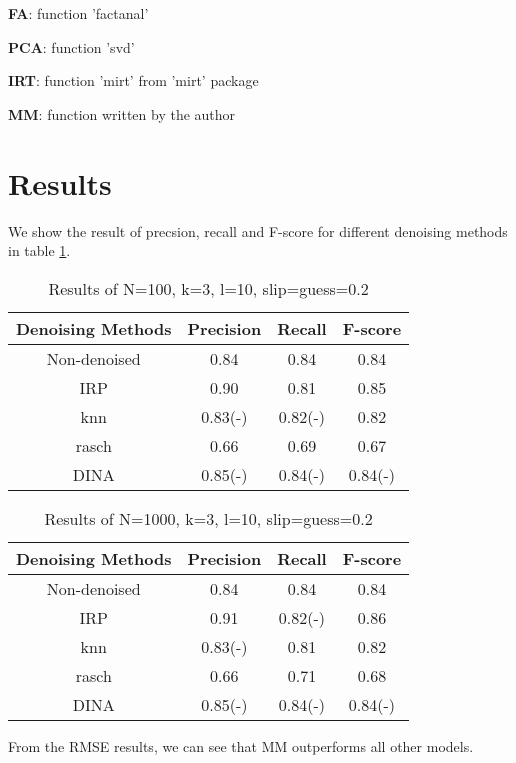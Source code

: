 \documentclass[11pt]{article}
\begin{document}
\textbf{FA}: function 'factanal'
  
\textbf{PCA}: function 'svd' 

\textbf{IRT}: function 'mirt' from 'mirt' package  

\textbf{MM}: function written by the author

\section{Results}
We show the result of precsion, recall and F-score for different denoising methods in table \ref{tab:results1}.
\begin{table}[!h]
\begin{center}
\begin{tabular}{|c|c|c|c|}
\hline
Denoising Methods & Precision & Recall & F-score\\
\hline
Non-denoised & 0.84 & 0.84 & 0.84  \\
\hline
IRP & 0.90 & 0.81 & 0.85 \\
\hline
knn & 0.83(-) & 0.82(-) & 0.82 \\
\hline
rasch & 0.66 & 0.69 & 0.67 \\
\hline
DINA & 0.85(-) & 0.84(-) & 0.84(-) \\
\hline
\end{tabular}
\end{center}
\caption{Results of N=100, k=3, l=10, slip=guess=0.2}\label{tab:results1}
\end{table}


\begin{table}[!h]
\begin{center}
\begin{tabular}{|c|c|c|c|}
\hline
Denoising Methods & Precision & Recall & F-score\\
\hline
Non-denoised & 0.84 & 0.84 & 0.84  \\
\hline
IRP & 0.91 & 0.82(-) & 0.86 \\
\hline
knn & 0.83(-) & 0.81 & 0.82 \\
\hline
rasch & 0.66 & 0.71 & 0.68 \\
\hline
DINA & 0.85(-) & 0.84(-) & 0.84(-) \\
\hline
\end{tabular}
\end{center}
\caption{Results of N=1000, k=3, l=10, slip=guess=0.2}\label{tab:results2}
\end{table}


From the RMSE results, we can see that MM outperforms all other models.
\end{document}
